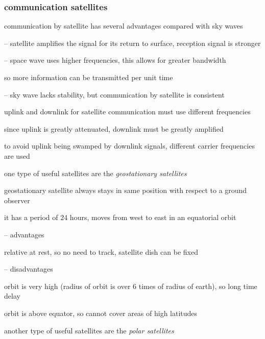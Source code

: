 \subsubsection*{communication satellites}

\cmt communication by satellite has several advantages compared with sky waves

\begin{compactitem}
	\item[--] satellite amplifies the signal for its return to surface, reception signal is stronger
	
	\item[--] space wave uses higher frequencies, this allows for greater bandwidth
	
	so more information can be transmitted per unit time
	
	\item[--] sky wave lacks stability, but communication by satellite is consistent
\end{compactitem}

\cmt uplink and downlink for satellite communication must use different frequencies

since uplink is greatly attenuated, downlink must be greatly amplified

to avoid uplink being swamped by downlink signals, different carrier frequencies are used

\cmt one type of useful satellites are the \emph{geostationary satellites}

geostationary satellite always stays in same position with respect to a ground observer

it has a period of 24 hours, moves from west to east in an equatorial orbit

\begin{compactitem}
	\item[--] advantages
	
	relative at rest, so no need to track, satellite dish can be fixed
	
	\item[--] disadvantages
	
	orbit is very high (radius of orbit is over 6 times of radius of earth), so long time delay
	
	orbit is above equator, so cannot cover areas of high latitudes
\end{compactitem}


\cmt another type of useful satellites are the \emph{polar satellites}

